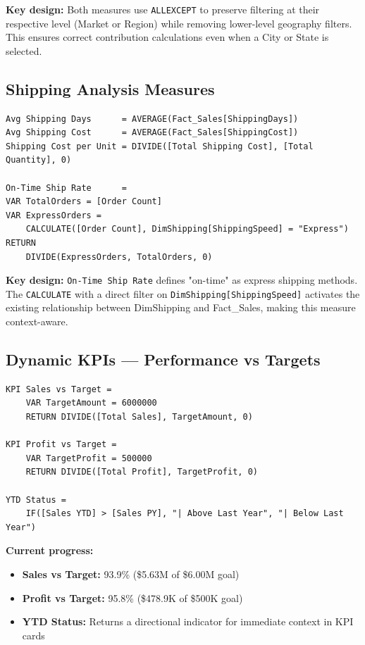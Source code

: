 \documentclass[11pt,a4paper]{article}
\begin{document}
\textbf{Key design:} Both measures use \texttt{ALLEXCEPT} to preserve filtering at their respective level (Market or Region) while removing lower-level geography filters. This ensures correct contribution calculations even when a City or State is selected.

\subsection{Shipping Analysis Measures}

\begin{lstlisting}
Avg Shipping Days      = AVERAGE(Fact_Sales[ShippingDays])
Avg Shipping Cost      = AVERAGE(Fact_Sales[ShippingCost])
Shipping Cost per Unit = DIVIDE([Total Shipping Cost], [Total Quantity], 0)

On-Time Ship Rate      =
VAR TotalOrders = [Order Count]
VAR ExpressOrders =
    CALCULATE([Order Count], DimShipping[ShippingSpeed] = "Express")
RETURN
    DIVIDE(ExpressOrders, TotalOrders, 0)
\end{lstlisting}

\textbf{Key design:} \texttt{On-Time Ship Rate} defines "on-time" as express shipping methods. The \texttt{CALCULATE} with a direct filter on \texttt{DimShipping[ShippingSpeed]} activates the existing relationship between DimShipping and Fact\_Sales, making this measure context-aware.

\subsection{Dynamic KPIs --- Performance vs Targets}

\begin{lstlisting}
KPI Sales vs Target =
    VAR TargetAmount = 6000000
    RETURN DIVIDE([Total Sales], TargetAmount, 0)

KPI Profit vs Target =
    VAR TargetProfit = 500000
    RETURN DIVIDE([Total Profit], TargetProfit, 0)

YTD Status =
    IF([Sales YTD] > [Sales PY], "| Above Last Year", "| Below Last Year")
\end{lstlisting}

\textbf{Current progress:}
\begin{itemize}
    \item \textbf{Sales vs Target:} 93.9\% (\$5.63M of \$6.00M goal)
    \item \textbf{Profit vs Target:} 95.8\% (\$478.9K of \$500K goal)
    \item \textbf{YTD Status:} Returns a directional indicator for immediate context in KPI cards
\end{itemize}
\end{document}

